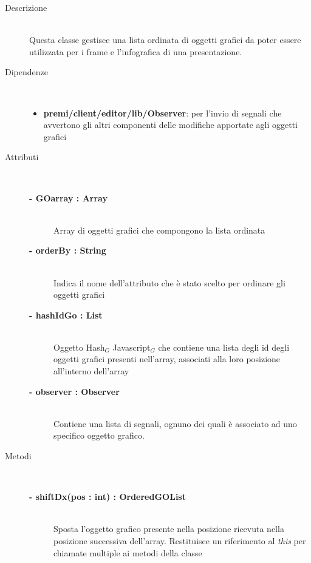 \begin{description}
\item[Descrizione] \hfill \\
	Questa classe gestisce una lista ordinata di oggetti grafici da poter essere utilizzata per i frame e l'infografica di una presentazione.
	
	
\item[Dipendenze] \hfill \\
	\begin{itemize}
		\item \textbf{premi/client/editor/lib/Observer}: per l'invio di segnali che avvertono gli altri componenti delle modifiche apportate agli oggetti grafici
	\end{itemize}
	
	
\item[Attributi] \hfill \\
	\begin{description}
		\item[\textbf{- GOarray : Array			}] \hfill \\
			Array di oggetti grafici che compongono la lista ordinata
		\item[\textbf{- orderBy : String			}] \hfill \\
			Indica il nome dell'attributo che è stato scelto per ordinare gli oggetti grafici
		\item[\textbf{- hashIdGo : List			}] \hfill \\
			Oggetto Hash$_G$ Javascript$_G$ che contiene una lista degli id degli oggetti grafici presenti nell'array, associati alla loro posizione all'interno dell'array
		\item[\textbf{- observer : Observer			}] \hfill \\
			Contiene una lista di segnali, ognuno dei quali è associato ad uno specifico oggetto grafico.
	\end{description}
	
	
\item[Metodi] \hfill \\

	\begin{description}
		\item[\textbf{\color{blue}- shiftDx(pos : int) : OrderedGOList			}] \hfill \\
			Sposta l'oggetto grafico presente nella posizione ricevuta nella posizione successiva dell'array. Restituisce un riferimento al \textit{this} per chiamate multiple ai metodi della classe
			

\end{description}
\end{description}
